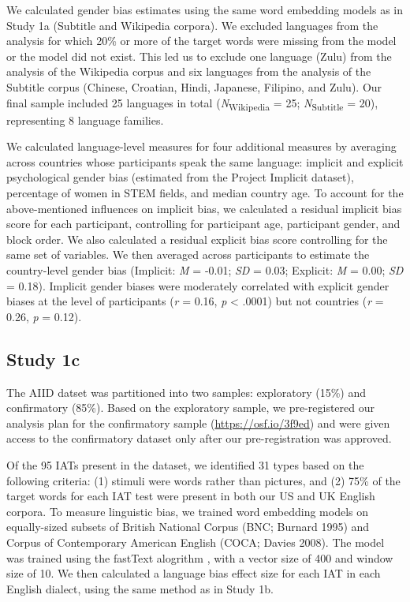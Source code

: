 \documentclass[9pt,twocolumn,twoside]{pnas-new}
\begin{document}
{We calculated gender bias estimates using the same word embedding models
as in Study 1a (Subtitle and Wikipedia corpora). We excluded languages
from the analysis for which 20\% or more of the target words were
missing from the model or the model did not exist. This led us to
exclude one language (Zulu) from the analysis of the Wikipedia corpus
and six languages from the analysis of the Subtitle corpus (Chinese,
Croatian, Hindi, Japanese, Filipino, and Zulu). Our final sample
included 25 languages in total (\emph{N}\textsubscript{Wikipedia} = 25;
\emph{N}\textsubscript{Subtitle} = 20), representing 8 language
families. 

We calculated language-level measures for four
additional measures by averaging across countries whose participants
speak the same language: implicit and explicit psychological gender bias
(estimated from the Project Implicit dataset), percentage of women in
STEM fields, and median country age.  To account for the above-mentioned influences on
implicit bias, we calculated a residual implicit bias score for each
participant, controlling for participant age, participant gender, and block
order. We also calculated a residual explicit bias score controlling for
the same set of variables. We then averaged across participants to
estimate the country-level gender bias (Implicit: \emph{M} = -0.01;
\emph{SD} = 0.03; Explicit: \emph{M} = 0.00; \emph{SD} = 0.18). Implicit
gender biases were moderately correlated with explicit gender biases at
the level of participants (\emph{r} = 0.16, \emph{p} \textless{} .0001)
but not countries (\emph{r} = 0.26, \emph{p} = 0.12).



\subsection*{Study 1c}

The AIID datset was partitioned into two samples: exploratory (15\%) and
confirmatory (85\%). Based on the exploratory sample, we pre-registered
our analysis plan for the confirmatory sample
(\url{https://osf.io/3f9ed}) and were given access to the confirmatory dataset only after our pre-registration was approved. 

Of the 95 IATs present in the dataset, we identified 31 types based on the following criteria: (1) stimuli were words rather than pictures, and (2) 75\% of the target words for each IAT test were present in both our US and UK English corpora. To measure linguistic bias, we trained word embedding models on equally-sized subsets of British National Corpus (BNC; Burnard 1995) and Corpus of Contemporary American English (COCA; Davies 2008). The model was trained using the fastText alogrithm \cite{joulin2016bag}, with a vector size of 400 and  window size of 10. We then calculated a language bias effect size for each IAT in each English dialect, using the same method as in Study 1b. 


}
\end{document}
